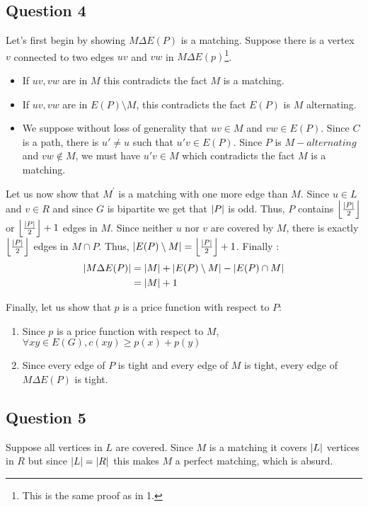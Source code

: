 \documentclass{cours}
\begin{document}
\subsection{Question 4}
Let's first begin by showing $M\Delta E(P)$ is a matching. Suppose there is a vertex $v$ connected to two edges $uv$ and $vw$ in $M\Delta E(p)$\footnote{This is the same proof as in 1.}.
\begin{itemize}
    \item If $uv, vw$ are in $M$ this contradicts the fact $M$ is a matching. 
    \item If $uv, vw$ are in $E(P) \setminus M$, this contradicts the fact $E(P)$ is $M$ alternating. 
    \item We suppose without loss of generality that $uv \in M$ and $vw \in E(P)$. Since $C$ is a path, there is $u' \neq u$ such that $u'v \in E(P)$. Since $P$ is $M-alternating$ and $vw \notin M$, we must have $u'v \in M$ which contradicts the fact $M$ is a matching.
\end{itemize}

Let us now show that $M^{'}$ is a matching with one more edge than $M$. Since $u \in L$ and $v \in R$ and since $G$ is bipartite we get that $\left|P\right|$ is odd. Thus, $P$ contains $\left\lfloor\frac{\left|P\right|}{2}\right\rfloor$ or $\left\lfloor\frac{\left|P\right|}{2}\right\rfloor + 1$ edges in $M$. Since neither $u$ nor $v$ are covered by $M$, there is exactly $\left\lfloor\frac{\left|P\right|}{2}\right\rfloor$ edges in $M \cap P$. Thus, $\left|E(P) \setminus M\right| = \left\lfloor\frac{\left|P\right|}{2}\right\rfloor + 1$. Finally :
\[
    \begin{aligned}
        \left|M \Delta E(P)\right| &= \left|M\right| + \left|E(P) \setminus M\right| - \left|E(P) \cap M\right|\\
        & = \left|M\right| + 1
    \end{aligned}    
\]

Finally, let us show that $p$ is a price function with respect to $P$:
\begin{enumerate}
    \item Since $p$ is a price function with respect to $M$, $\forall xy \in E(G), c(xy) \geq p(x) + p(y)$
    \item Since every edge of $P$ is tight and every edge of $M$ is tight, every edge of $M\Delta E(P)$ is tight. 
\end{enumerate}

\subsection{Question 5}
Suppose all vertices in $L$ are covered. Since $M$ is a matching it covers $\left|L\right|$ vertices in $R$ but since $\left|L\right| = \left|R\right|$ this makes $M$ a perfect matching, which is absurd. 
\end{document}

